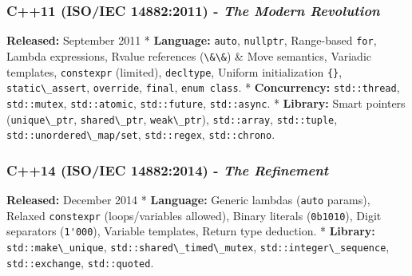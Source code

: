 \hypertarget{c11-isoiec-148822011---the-modern-revolution}{%
\subsubsection{\texorpdfstring{\textbf{C++11 (ISO/IEC 14882:2011)} -
\emph{The Modern
Revolution}}{C++11 (ISO/IEC 14882:2011) - The Modern Revolution}}\label{c11-isoiec-148822011---the-modern-revolution}}

\textbf{Released:} September 2011 * \textbf{Language:}
\passthrough{\lstinline!auto!}, \passthrough{\lstinline!nullptr!},
Range-based \passthrough{\lstinline!for!}, Lambda expressions, Rvalue
references (\passthrough{\lstinline!\&\&!}) \& Move semantics, Variadic
templates, \passthrough{\lstinline!constexpr!} (limited),
\passthrough{\lstinline!decltype!}, Uniform initialization
\passthrough{\lstinline!\{\}!},
\passthrough{\lstinline!static\_assert!},
\passthrough{\lstinline!override!}, \passthrough{\lstinline!final!},
\passthrough{\lstinline!enum class!}. * \textbf{Concurrency:}
\passthrough{\lstinline!std::thread!},
\passthrough{\lstinline!std::mutex!},
\passthrough{\lstinline!std::atomic!},
\passthrough{\lstinline!std::future!},
\passthrough{\lstinline!std::async!}. * \textbf{Library:} Smart pointers
(\passthrough{\lstinline!unique\_ptr!},
\passthrough{\lstinline!shared\_ptr!},
\passthrough{\lstinline!weak\_ptr!}),
\passthrough{\lstinline!std::array!},
\passthrough{\lstinline!std::tuple!},
\passthrough{\lstinline!std::unordered\_map/set!},
\passthrough{\lstinline!std::regex!},
\passthrough{\lstinline!std::chrono!}.

\hypertarget{c14-isoiec-148822014---the-refinement}{%
\subsubsection{\texorpdfstring{\textbf{C++14 (ISO/IEC 14882:2014)} -
\emph{The
Refinement}}{C++14 (ISO/IEC 14882:2014) - The Refinement}}\label{c14-isoiec-148822014---the-refinement}}

\textbf{Released:} December 2014 * \textbf{Language:} Generic lambdas
(\passthrough{\lstinline!auto!} params), Relaxed
\passthrough{\lstinline!constexpr!} (loops/variables allowed), Binary
literals (\passthrough{\lstinline!0b1010!}), Digit separators
(\passthrough{\lstinline!1'000!}), Variable templates, Return type
deduction. * \textbf{Library:}
\passthrough{\lstinline!std::make\_unique!},
\passthrough{\lstinline!std::shared\_timed\_mutex!},
\passthrough{\lstinline!std::integer\_sequence!},
\passthrough{\lstinline!std::exchange!},
\passthrough{\lstinline!std::quoted!}.

